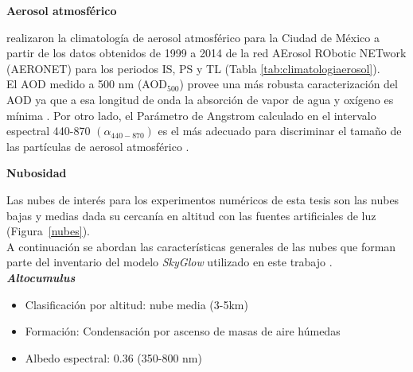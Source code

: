 \textbf{Aerosol atmosférico}

\cite{Carabali2017} realizaron la climatología de aerosol atmosférico para la Ciudad de México a partir de los datos obtenidos de 1999 a 2014 de la red AErosol RObotic NETwork (AERONET) para los periodos IS, PS y TL  (Tabla \ref{tab:climatologiaerosol}).\\

El AOD medido a 500 nm (AOD$_{500}$) provee una más robusta caracterización del AOD ya que a esa longitud de onda la absorción de vapor de agua y oxígeno es mínima \citep{Kanniah2009}. Por otro lado, el Parámetro de Angstrom calculado en el intervalo espectral 440-870 $(\alpha_{440-870})$ es el más adecuado para discriminar el tamaño de las partículas de aerosol atmosférico \citep{Kaskaoutis2007}.

\begin{table}[htb]
\centering
\caption{Climatología de aerosol atmosférico en la Ciudad de México \citep{Carabali2017}}
\label{tab:climatologiaerosol}
\end{table}

\newpage

\textbf{Nubosidad}

Las nubes de interés para los experimentos numéricos de esta tesis son las nubes bajas y medias dada su cercanía en altitud con las fuentes artificiales de luz (Figura~\ref{nubes}).\\

A continuación se abordan las características generales de las nubes que forman parte del inventario del modelo \textit{SkyGlow} utilizado en este trabajo \citep{Cloudatlas1987,Solano2015}.\\

\textit{\textbf{Altocumulus}}

\begin{itemize}

    \item Clasificación por altitud: nube media (3-5km)
    
    \item Formación: Condensación por ascenso de masas de aire húmedas
    
    \item Albedo espectral: 0.36 (350-800 nm)
    
\end{itemize}

